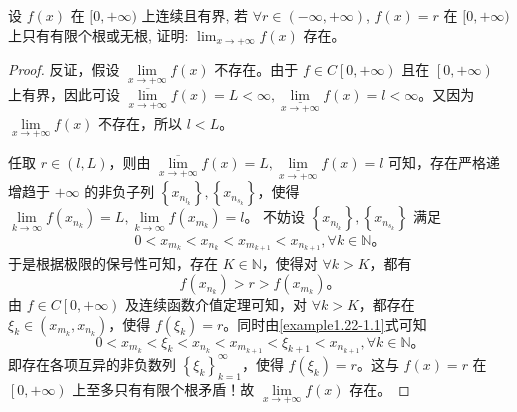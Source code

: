 \documentclass[lang=cn,newtx,10pt,scheme=chinese]{../Template/elegantbook}
\begin{document}
\begin{example}
设 $f(x)$ 在 $[0, +\infty)$ 上连续且有界, 若 $\forall r \in (-\infty, +\infty)$, $f(x) = r$ 在 $[0, +\infty)$ 上只有有限个根或无根, 证明: $\lim_{x \to +\infty} f(x)$ 存在。
\end{example}
\begin{proof}
反证，假设 $\underset{x\rightarrow +\infty}{\lim}f\left( x \right)$ 不存在。由于 $f\in C\left[ 0,+\infty \right)$ 且在 $\left[ 0,+\infty \right)$ 上有界，因此可设 $\underset{x\rightarrow +\infty}{\overline{\lim }}f\left( x \right) =L<\infty ,\underset{x\rightarrow +\infty}{\underline{\lim }}f\left( x \right) =l<\infty$。又因为 $\underset{x\rightarrow +\infty}{\lim}f\left( x \right)$ 不存在，所以 $l<L$。

任取 $r\in \left( l,L \right)$，则由 $\underset{x\rightarrow +\infty}{\overline{\lim }}f\left( x \right) =L,\underset{x\rightarrow +\infty}{\underline{\lim }}f\left( x \right) =l$ 可知，存在严格递增趋于 $+\infty$ 的非负子列 $\left\{ x_{n_{l_k}} \right\},\left\{ x_{n_{s_k}} \right\}$，使得 $\underset{k\rightarrow \infty}{\lim}f\left( x_{n_k} \right) =L,\underset{k\rightarrow \infty}{\lim}f\left( x_{m_k} \right) =l$。
不妨设 $\left\{ x_{n_{l_k}} \right\},\left\{ x_{n_{s_k}} \right\}$ 满足  
\begin{align}
0<x_{m_k}<x_{n_k}<x_{m_{k+1}}<x_{n_{k+1}},\forall k\in \mathbb{N}。 \label{example1.22-1.1}
\end{align}
于是根据极限的保号性可知，存在 $K\in \mathbb{N}$，使得对 $\forall k>K$，都有  
\[
f\left( x_{n_k} \right) >r>f\left( x_{m_k} \right)。
\]
由 $f\in C\left[ 0,+\infty \right)$ 及连续函数介值定理可知，对 $\forall k>K$，都存在 $\xi _k\in \left( x_{m_k},x_{n_k} \right)$，使得 $f\left( \xi _k \right) =r$。同时由\eqref{example1.22-1.1}式可知  
\[
0<x_{m_k}<\xi _k<x_{n_k}<x_{m_{k+1}}<\xi _{k+1}<x_{n_{k+1}},\forall k\in \mathbb{N}。
\]
即存在各项互异的非负数列 $\left\{ \xi _k \right\} _{k=1}^{\infty}$，使得 $f\left( \xi _k \right) =r$。这与 $f\left( x \right) =r$ 在 $\left[ 0,+\infty \right)$ 上至多只有有限个根矛盾！故 $\underset{x\rightarrow +\infty}{\lim}f\left( x \right)$ 存在。
\end{proof}
\end{document}
